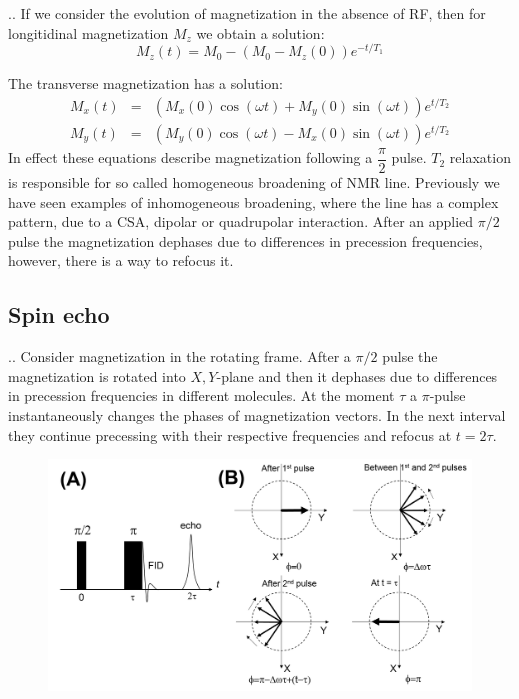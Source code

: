 \documentclass[handout]{beamer}
\begin{document}
\begin{frame}{\thesection.\thesubsection. \insertsubsection}
	If we consider the evolution of magnetization in the absence of RF, then for longitidinal magnetization $M_z$ we obtain a solution:
	\begin{equation}
		M_z(t) = M_0 - (M_0 - M_z(0)  ) e^{-t/T_1}		
	\end{equation}
	
	
	The transverse magnetization has a solution:
	\begin{equation}
	\begin{array}{lcl}
       M_x(t)&=& (M_x(0) \cos( \omega t)  + M_y(0) \sin( \omega t)) e^{t/T_2} \\     
       M_y(t)&=& (M_y(0) \cos( \omega t)  - M_x(0) \sin( \omega t)) e^{t/T_2} 
	\end{array}
	\end{equation}
	In effect these equations describe magnetization following a $\dfrac{\pi}{2}$ pulse. 
    $T_2$ relaxation is responsible for so called \alert{homogeneous} broadening of NMR line. Previously we have seen examples of \alert{inhomogeneous} broadening, where the line has a complex pattern, due to a CSA, dipolar or quadrupolar interaction. After an applied $\pi/2$ pulse the magnetization dephases due to differences in precession frequencies, however, there is a way to refocus it. 
\end{frame}

\subsection{Spin echo}
\begin{frame}{\thesection.\thesubsection. \insertsubsection}
  Consider magnetization in the rotating frame.  After a $\pi/2$ pulse the magnetization is rotated into $X,Y$-plane and then it dephases due to differences in precession frequencies in different molecules. At the moment $\tau$ a $\pi$-pulse instantaneously changes the phases of magnetization vectors. In the next interval they continue precessing with their respective frequencies and refocus at $t = 2 \tau$. 
  \begin{figure}
  	\centering
  	\includegraphics[scale =0.3]{spin_echo.png}
  \end{figure}
\end{frame}
\end{document}
